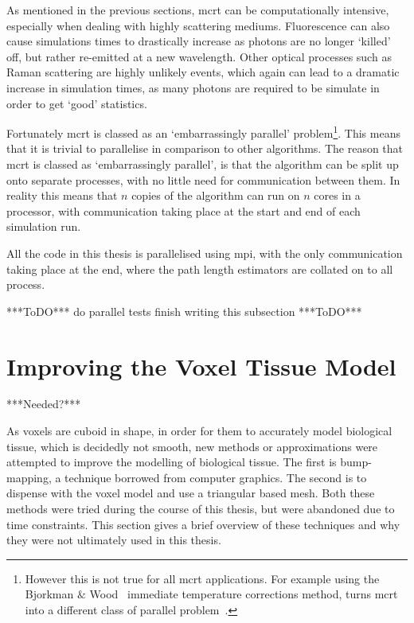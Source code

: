 As mentioned in the previous sections, \gls{mcrt} can be computationally intensive, especially when dealing with highly scattering mediums. Fluorescence can also cause simulations times to drastically increase as photons are no longer `killed' off, but rather re-emitted at a new wavelength. Other optical processes such as Raman scattering are highly unlikely events, which again can lead to a dramatic increase in simulation times, as many photons are required to be simulate in order to get `good' statistics.

Fortunately \gls{mcrt} is classed as an `embarrassingly parallel' problem\footnote{However this is not true for all \gls{mcrt} applications. For example using the Bjorkman $\&$ Wood~\cite{bjorkman2001radiative} immediate temperature corrections method, turns \gls{mcrt} into a different class of parallel problem~\cite{robitaille2011hyperion}.}. This means that it is trivial to parallelise in comparison to other algorithms. The reason that \gls{mcrt} is classed as `embarrassingly parallel', is that the algorithm can be split up onto separate processes, with no little need for communication between them. In reality this means that $n$ copies of the algorithm can run on $n$ cores in a processor, with communication taking place at the start and end of each simulation run. 

All the code in this thesis is parallelised using \gls{mpi}, with the only communication taking place at the end, where the path length estimators are collated on to all process. 

***ToDO***
do parallel tests
finish writing this subsection
***ToDO***

\section{Improving the Voxel Tissue Model}\label{sec:improve}

***Needed?***

As voxels are cuboid in shape, in order for them to accurately model biological tissue, which is decidedly not smooth, new methods or approximations were attempted to improve the modelling of biological tissue. 
The first is bump-mapping, a technique borrowed from computer graphics. The second is to dispense with the voxel model and use a triangular based mesh. Both these methods were tried during the course of this thesis, but were abandoned due to time constraints. This section gives a brief overview of these techniques and why they were not ultimately used in this thesis.
